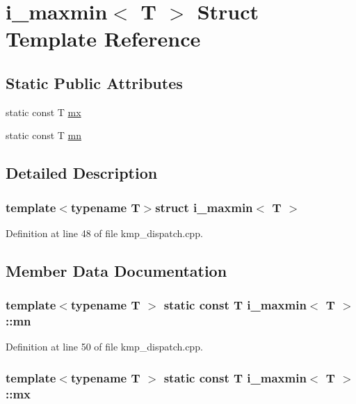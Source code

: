 \hypertarget{structi__maxmin}{\section{i\-\_\-maxmin$<$ T $>$ Struct Template Reference}
\label{structi__maxmin}
}
\subsection*{Static Public Attributes}
\begin{DoxyCompactItemize}
\item 
static const T \hyperlink{structi__maxmin_a63ca8c1703ce381b720bf0b3953f8c5e}{mx}
\item 
static const T \hyperlink{structi__maxmin_a70852044b4bde382ffd4e0fc630b69c4}{mn}
\end{DoxyCompactItemize}


\subsection{Detailed Description}
\subsubsection*{template$<$typename T$>$struct i\-\_\-maxmin$<$ T $>$}



Definition at line 48 of file kmp\-\_\-dispatch.\-cpp.



\subsection{Member Data Documentation}
\hypertarget{structi__maxmin_a70852044b4bde382ffd4e0fc630b69c4}{
\subsubsection[{mn}]{\setlength{\rightskip}{0pt plus 5cm}template$<$typename T $>$ static const T {\bf i\-\_\-maxmin}$<$ T $>$\-::mn\hspace{0.3cm}{\ttfamily [static]}}}\label{structi__maxmin_a70852044b4bde382ffd4e0fc630b69c4}


Definition at line 50 of file kmp\-\_\-dispatch.\-cpp.

\hypertarget{structi__maxmin_a63ca8c1703ce381b720bf0b3953f8c5e}{
\subsubsection[{mx}]{\setlength{\rightskip}{0pt plus 5cm}template$<$typename T $>$ static const T {\bf i\-\_\-maxmin}$<$ T $>$\-::mx\hspace{0.3cm}{\ttfamily [static]}}}\label{structi__maxmin_a63ca8c1703ce381b720bf0b3953f8c5e}


